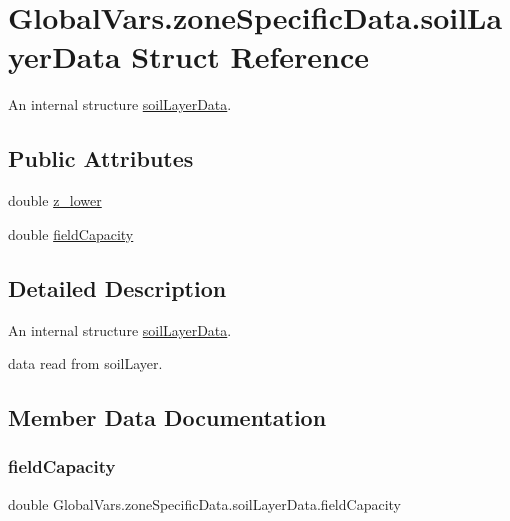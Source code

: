 \hypertarget{struct_global_vars_1_1zone_specific_data_1_1soil_layer_data}{}\section{Global\+Vars.\+zone\+Specific\+Data.\+soil\+Layer\+Data Struct Reference}
\label{struct_global_vars_1_1zone_specific_data_1_1soil_layer_data}


An internal structure \mbox{\hyperlink{struct_global_vars_1_1zone_specific_data_1_1soil_layer_data}{soil\+Layer\+Data}}.  


\subsection*{Public Attributes}
\begin{DoxyCompactItemize}
\item 
double \mbox{\hyperlink{struct_global_vars_1_1zone_specific_data_1_1soil_layer_data_a92d37767e9dfbc2853580e82bf9a79ef}{z\+\_\+lower}}
\item 
double \mbox{\hyperlink{struct_global_vars_1_1zone_specific_data_1_1soil_layer_data_a8ec6cdbbe40d5e04bbb7a07faa5ddffb}{field\+Capacity}}
\end{DoxyCompactItemize}


\subsection{Detailed Description}
An internal structure \mbox{\hyperlink{struct_global_vars_1_1zone_specific_data_1_1soil_layer_data}{soil\+Layer\+Data}}. 

data read from soil\+Layer. 

\subsection{Member Data Documentation}
\mbox{\label{struct_global_vars_1_1zone_specific_data_1_1soil_layer_data_a8ec6cdbbe40d5e04bbb7a07faa5ddffb}} 
\subsubsection{\texorpdfstring{fieldCapacity}{fieldCapacity}}
{\footnotesize\ttfamily double Global\+Vars.\+zone\+Specific\+Data.\+soil\+Layer\+Data.\+field\+Capacity}

